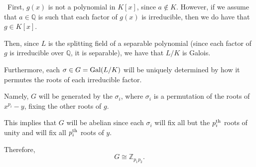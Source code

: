 \documentclass[12pt]{Qual}
\begin{document}
\begin{solution}$\,$
First, $g(x)$ is not a polynomial in $K[x]$, since $a\not\in K$. However, if we assume that $a\in\mathbb{Q}$ is such that each factor of $g(x)$ is irreducible, then we do have that $g\in K[x]$.

Then, since $L$ is the splitting field of a separable polynomial (since each factor of $g$ is irreducible over $\mathbb{Q}$, it is separable), we have that $L/K$ is Galois.

 Furthermore, each $\sigma\in G=\text{Gal}(L/K)$ will be uniquely determined by how it permutes the roots of each irreducible factor.

Namely, $G$ will be generated by the $\sigma_i$, where $\sigma_i$ is a permutation of the roots of $x^{p_i}-y$, fixing the other roots of $g.$

This implies that $G$ will be abelian since each $\sigma_i$ will fix all but the $p_i^\text{th}$ roots of unity and will fix all $p_i^\text{th}$ roots of $y.$

Therefore, $$G\cong\mathbb{Z}_{p_1p_2}.$$
\end{solution}
\end{document}
